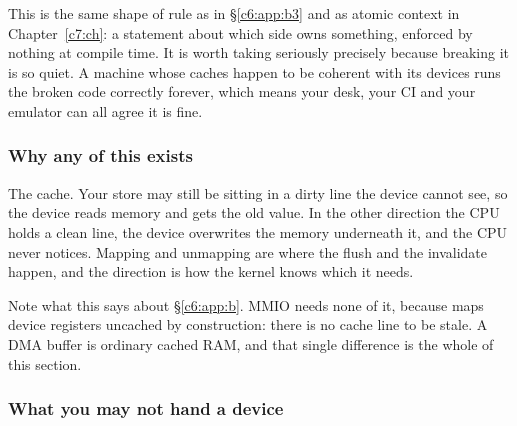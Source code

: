 This is the same shape of rule as  in \S\ref{c6:app:b3} and as atomic context in
Chapter~\ref{c7:ch}: a statement about which side owns something, enforced by nothing at compile
time. It is worth taking seriously precisely because breaking it is so quiet. A machine whose caches
happen to be coherent with its devices runs the broken code correctly forever, which means your
desk, your CI and your emulator can all agree it is fine.

\subsubsection{Why any of this exists}
\label{c6:app:a:why-any-of-this-exists}

The cache. Your store may still be sitting in a dirty line the device cannot see, so the device
reads memory and gets the old value. In the other direction the CPU holds a clean line, the device
overwrites the memory underneath it, and the CPU never notices. Mapping and unmapping are where the
flush and the invalidate happen, and the direction is how the kernel knows which it needs.

Note what this says about \S\ref{c6:app:b}. MMIO needs none of it, because  maps
device registers uncached by construction: there is no cache line to be stale. A DMA buffer is
ordinary cached RAM, and that single difference is the whole of this section.

\subsubsection{What you may not hand a device}
\label{c6:app:a:what-you-may-not-hand-a-device}

